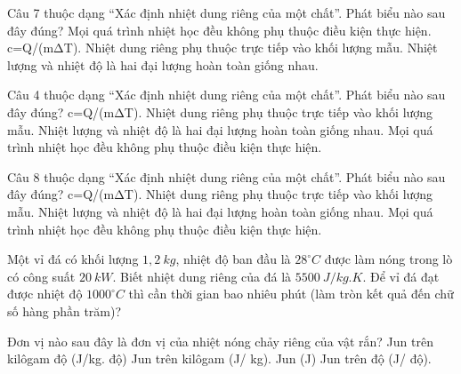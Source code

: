 \begin{ex}
Câu 7 thuộc dạng “Xác định nhiệt dung riêng của một chất”. Phát biểu nào sau đây đúng?
\choice
{Mọi quá trình nhiệt học đều không phụ thuộc điều kiện thực hiện.}
{\True c=Q/(mΔT).}
{Nhiệt dung riêng phụ thuộc trực tiếp vào khối lượng mẫu.}
{Nhiệt lượng và nhiệt độ là hai đại lượng hoàn toàn giống nhau.}
\end{ex}

\begin{ex}
Câu 4 thuộc dạng “Xác định nhiệt dung riêng của một chất”. Phát biểu nào sau đây đúng?
\choice
{\True c=Q/(mΔT).}
{Nhiệt dung riêng phụ thuộc trực tiếp vào khối lượng mẫu.}
{Nhiệt lượng và nhiệt độ là hai đại lượng hoàn toàn giống nhau.}
{Mọi quá trình nhiệt học đều không phụ thuộc điều kiện thực hiện.}
\end{ex}

\begin{ex}
Câu 8 thuộc dạng “Xác định nhiệt dung riêng của một chất”. Phát biểu nào sau đây đúng?
\choice
{\True c=Q/(mΔT).}
{Nhiệt dung riêng phụ thuộc trực tiếp vào khối lượng mẫu.}
{Nhiệt lượng và nhiệt độ là hai đại lượng hoàn toàn giống nhau.}
{Mọi quá trình nhiệt học đều không phụ thuộc điều kiện thực hiện.}
\end{ex}

\begin{bt}
Một vỉ đá có khối lượng $1,2\ kg$, nhiệt độ ban đầu là $28^\circ C$ được làm nóng trong lò có công suất $20\ kW$. Biết nhiệt dung riêng của đá là $5500\ J/kg.K$. Để vỉ đá đạt được nhiệt độ $1000^\circ C$ thì cần thời gian bao nhiêu phút (làm tròn kết quả đến chữ số hàng phần trăm)?
\end{bt}
\begin{ex}
Đơn vị nào sau đây là đơn vị của nhiệt nóng chảy riêng của vật rắn?
\choice
{Jun trên kilôgam độ (J/kg. độ)}
{\True Jun trên kilôgam (J/ kg).}
{Jun (J)}
{Jun trên độ (J/ độ).}
\end{ex}

